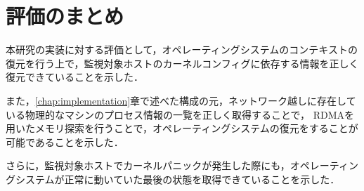 \section{評価のまとめ}

本研究の実装に対する評価として，オペレーティングシステムのコンテキストの復元を行う上で，監視対象ホストのカーネルコンフィグに依存する情報を正しく復元できていることを示した．

また，\ref{chap:implementation}章で述べた構成の元，ネットワーク越しに存在している物理的なマシンのプロセス情報の一覧を正しく取得することで，
RDMAを用いたメモリ探索を行うことで，オペレーティングシステムの復元をすることが可能であることを示した．

さらに，監視対象ホストでカーネルパニックが発生した際にも，オペレーティングシステムが正常に動いていた最後の状態を取得できていることを示した．
